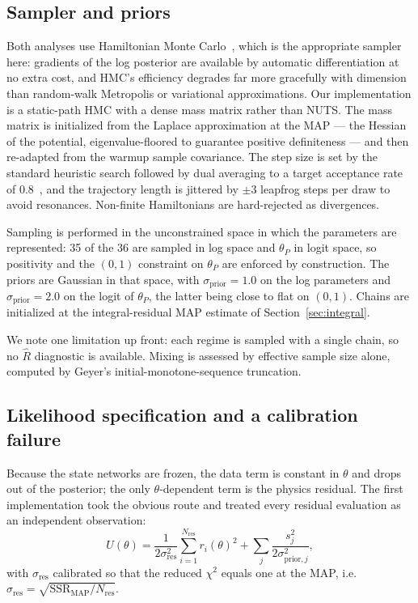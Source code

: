 \documentclass[11pt]{article}
\newcommand{\thP}{\theta_P}
\begin{document}
\subsection{Sampler and priors}

Both analyses use Hamiltonian Monte Carlo~\citep{neal2011mcmc}, which is the
appropriate sampler here: gradients of the log posterior are available by
automatic differentiation at no extra cost, and HMC's efficiency degrades far
more gracefully with dimension than random-walk Metropolis or variational
approximations. Our implementation is a static-path HMC with a dense mass
matrix rather than NUTS. The mass matrix is initialized from the Laplace
approximation at the MAP --- the Hessian of the potential, eigenvalue-floored
to guarantee positive definiteness --- and then re-adapted from the warmup
sample covariance. The step size is set by the standard heuristic search
followed by dual averaging to a target acceptance rate of
$0.8$~\citep{hoffman2014nuts}, and the trajectory length is jittered by
$\pm 3$ leapfrog steps per draw to avoid resonances. Non-finite Hamiltonians
are hard-rejected as divergences.

Sampling is performed in the unconstrained space in which the parameters are
represented: 35 of the 36 are sampled in log space and $\thP$ in logit space,
so positivity and the $(0,1)$ constraint on $\thP$ are enforced by
construction. The priors are Gaussian in that space, with $\sigma_{\text{prior}}
= 1.0$ on the log parameters and $\sigma_{\text{prior}} = 2.0$ on the logit of
$\thP$, the latter being close to flat on $(0,1)$. Chains are initialized at
the integral-residual MAP estimate of Section~\ref{sec:integral}.

We note one limitation up front: each regime is sampled with a single chain, so
no $\hat{R}$ diagnostic is available. Mixing is assessed by effective sample
size alone, computed by Geyer's initial-monotone-sequence truncation.

\subsection{Likelihood specification and a calibration failure}
\label{sec:bayesfail}

Because the state networks are frozen, the data term is constant in $\theta$
and drops out of the posterior; the only $\theta$-dependent term is the physics
residual. The first implementation took the obvious route and treated every
residual evaluation as an independent observation:
\begin{equation}
U(\theta) = \frac{1}{2\sigma_{\text{res}}^2}
\sum_{i=1}^{N_{\text{res}}} r_i(\theta)^2
+ \sum_j \frac{s_j^2}{2\sigma_{\text{prior},j}^2},
\label{eq:badpotential}
\end{equation}
with $\sigma_{\text{res}}$ calibrated so that the reduced $\chi^2$ equals one
at the MAP, i.e. $\sigma_{\text{res}} = \sqrt{\mathrm{SSR}_{\mathrm{MAP}} /
N_{\text{res}}}$.
\end{document}
